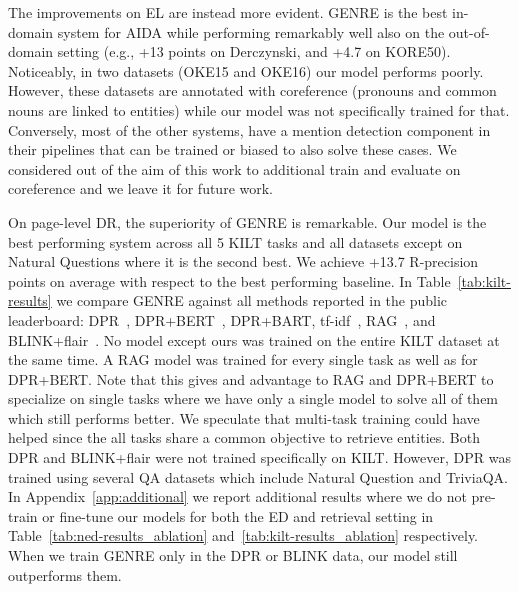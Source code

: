 \documentclass{article} \usepackage{main,times}
\makeatletter
\def\genre{\textsc{GENRE}\@\xspace}
\makeatother
\begin{document}
The improvements on EL are instead more evident. \genre is the best in-domain system for AIDA while 
performing remarkably well also on the out-of-domain setting (e.g., +13  points on Derczynski, and +4.7 on KORE50). Noticeably, in two datasets (OKE15 and OKE16) our model performs poorly. However, these datasets are annotated with coreference (pronouns and common nouns are linked to entities) while our model was not specifically trained for that. Conversely, most of the other systems, have a mention detection component in their pipelines that can be trained or biased to also solve these cases. We considered out of the aim of this work to additional train and evaluate on coreference and we leave it for future work.


On page-level DR, the superiority of \genre is remarkable. Our model is the best performing system across all 5 KILT tasks and all datasets except on Natural Questions where it is the second best. We achieve +13.7 R-precision points on average with respect to the best performing baseline.
In Table~\ref{tab:kilt-results} we compare \genre
against all methods reported in the public leaderboard: DPR~\citep{karpukhin2020dense}, DPR+BERT~\citep{devlin-etal-2019-bert}, DPR+BART, tf-idf~\citep{10.5555/2787930}, RAG~\citep{lewis2020retrievalaugmented}, and BLINK+flair~\citep{wu-etal-2020-scalable, akbik-etal-2019-flair}. No model except ours was trained on the entire KILT dataset at the same time. A RAG model was trained for every single task as well as for DPR+BERT. Note that this gives and advantage to RAG and DPR+BERT to specialize on single tasks where we have only a single model to solve all of them which still performs better. We speculate that multi-task training could have helped since the all tasks share a common objective to retrieve entities. Both DPR and BLINK+flair were not trained specifically on KILT. However, DPR was trained using several QA datasets which include Natural Question and TriviaQA. In Appendix~\ref{app:additional} we report additional results where we do not pre-train or fine-tune our models for both the ED and retrieval setting in Table~\ref{tab:ned-results_ablation} and~\ref{tab:kilt-results_ablation} respectively. When we train \genre only in the DPR or BLINK data, our model still outperforms them. 
\end{document}
